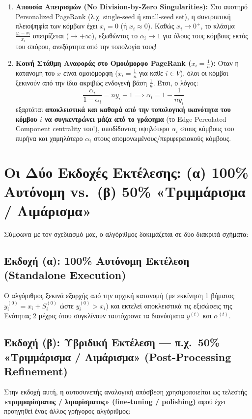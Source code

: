 \documentclass[11pt, a4paper]{article}
\begin{document}
\begin{enumerate}
    \item \textbf{Απουσία Απειρισμών (No Division-by-Zero Singularities):} Στο αυστηρό Personalized PageRank (λ.χ. single-seed ή small-seed set), η συντριπτική πλειοψηφία των κόμβων έχει $x_i = 0$ (ή $x_i \approx 0$). Καθώς $x_i \to 0^+$, το κλάσμα $\frac{y_i - x_i}{x_i}$ απειρίζεται ($\to +\infty$), εξωθώντας το $\alpha_i \to 1$ για όλους τους κόμβους εκτός του σπόρου, ανεξάρτητα από την τοπολογία τους!
    \item \textbf{Κοινή Στάθμη Αναφοράς στο Ομοιόμορφο PageRank ($x_i = \frac{1}{n}$):} Όταν η κατανομή του $x$ είναι ομοιόμορφη ($x_i = \frac{1}{n}$ για κάθε $i \in V$), όλοι οι κόμβοι ξεκινούν από την ίδια ακριβώς ενδογενή βάση $\frac{1}{n}$. Έτσι, ο λόγος:
    \[
    \frac{\alpha_i}{1 - \alpha_i} = n y_i - 1 \implies \alpha_i = 1 - \frac{1}{n y_i}
    \]
    εξαρτάται \textbf{αποκλειστικά και καθαρά από την τοπολογική ικανότητα του κόμβου $i$ να συγκεντρώνει μάζα από το γράφημα} (το Edge Percolated Component centrality του!), αποδίδοντας υψηλότερο $\alpha_i$ στους κόμβους του πυρήνα και χαμηλότερο $\alpha_i$ στους απομονωμένους/περιφερειακούς κόμβους.
\end{enumerate}

\section{Οι Δύο Εκδοχές Εκτέλεσης: (α) 100\% Αυτόνομη vs.\ (β) 50\% «Τριμμάρισμα / Λιμάρισμα»}

Σύμφωνα με τον σχεδιασμό μας, ο αλγόριθμος δοκιμάζεται σε δύο διακριτά σχήματα:

\subsection{Εκδοχή (α): 100\% Αυτόνομη Εκτέλεση (Standalone Execution)}
Ο αλγόριθμος ξεκινά εξαρχής από την αρχική κατανομή (με εκκίνηση 1 βήματος $y_i^{(0)} = x_i + S_i^{(0)}$ ώστε $y_i^{(0)} > x_i$) και εκτελεί αποκλειστικά τις εξισώσεις της Ενότητας 2 μέχρις ότου συγκλίνουν ταυτόχρονα τα διανύσματα $y^{(t)}$ και $\alpha^{(t)}$.

\subsection{Εκδοχή (β): Υβριδική Εκτέλεση --- π.χ.\ 50\% «Τριμμάρισμα / Λιμάρισμα» (Post-Processing Refinement)}
Στην εκδοχή αυτή, η αυτοσυνεπής αναλογική απόσβεση χρησιμοποιείται ως τελεστής \textbf{«τριμμαρίσματος / λιμαρίσματος» (fine-tuning / polishing)} αφού έχει προηγηθεί ένας άλλος γρήγορος αλγόριθμος:
\end{document}
